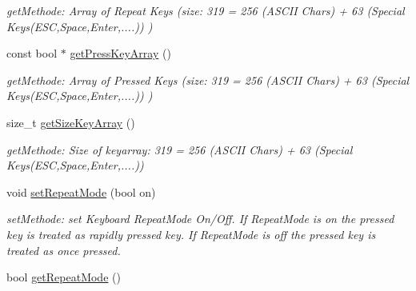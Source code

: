 \begin{DoxyCompactItemize}
\begin{DoxyCompactList}\small\item\em getMethode: Array of Repeat Keys (size: 319 = 256 (ASCII Chars) + 63 (Special Keys(ESC,Space,Enter,....)) ) \item\end{DoxyCompactList}\item 
\hypertarget{class_f2_c_1_1_input_a7a4c16d3b99c6c16ca32646db5b24586}{
const bool $\ast$ \hyperlink{class_f2_c_1_1_input_a7a4c16d3b99c6c16ca32646db5b24586}{getPressKeyArray} ()}
\label{class_f2_c_1_1_input_a7a4c16d3b99c6c16ca32646db5b24586}

\begin{DoxyCompactList}\small\item\em getMethode: Array of Pressed Keys (size: 319 = 256 (ASCII Chars) + 63 (Special Keys(ESC,Space,Enter,....)) ) \item\end{DoxyCompactList}\item 
\hypertarget{class_f2_c_1_1_input_a378b279161ad643dce3f7c5818343c29}{
size\_\-t \hyperlink{class_f2_c_1_1_input_a378b279161ad643dce3f7c5818343c29}{getSizeKeyArray} ()}
\label{class_f2_c_1_1_input_a378b279161ad643dce3f7c5818343c29}

\begin{DoxyCompactList}\small\item\em getMethode: Size of keyarray: 319 = 256 (ASCII Chars) + 63 (Special Keys(ESC,Space,Enter,....)) \item\end{DoxyCompactList}\item 
void \hyperlink{class_f2_c_1_1_input_a48e3b0a537bc1e49e3910021e8b4e299}{setRepeatMode} (bool on)
\begin{DoxyCompactList}\small\item\em setMethode: set Keyboard RepeatMode On/Off. If RepeatMode is on the pressed key is treated as rapidly pressed key. If RepeatMode is off the pressed key is treated as once pressed. \item\end{DoxyCompactList}\item 
\hypertarget{class_f2_c_1_1_input_a1fc788dab81fb6972b9825d6842ce245}{
bool \hyperlink{class_f2_c_1_1_input_a1fc788dab81fb6972b9825d6842ce245}{getRepeatMode} ()}
\label{class_f2_c_1_1_input_a1fc788dab81fb6972b9825d6842ce245}


\end{DoxyCompactItemize}
